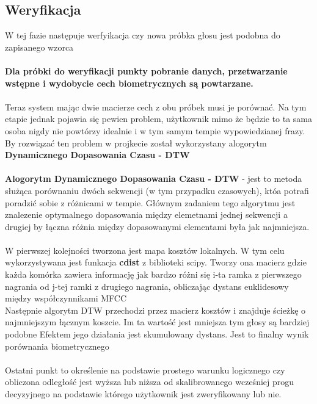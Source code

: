 \subsection{Weryfikacja}
W tej fazie następuje werfyikacja czy nowa próbka głosu jest podobna do zapisanego wzorca
\\
\\
\textbf{Dla próbki do weryfikacji punkty pobranie danych, przetwarzanie wstępne i wydobycie cech biometrycznych są powtarzane.}
\\
\\
Teraz system mając dwie macierze cech z obu próbek musi je porównać. Na tym etapie jednak pojawia się pewien problem, użytkownik mimo że będzie to ta sama osoba nigdy nie powtórzy idealnie i w tym samym tempie wypowiedzianej frazy. By rozwiązać ten problem w projkecie został wykorzystany alogorytm \textbf{Dynamicznego Dopasowania Czasu - DTW}
\\
\\
\textbf{Alogorytm Dynamicznego Dopasowania Czasu - DTW} - jest to metoda służąca porównaniu dwóch sekwencji (w tym przypadku czasowych), któa potrafi poradzić sobie z różnicami w tempie.
Głównym zadaniem tego algorytmu jest znalezenie optymalnego dopasowania między elemetnami jednej sekwencji a drugiej by łączna różnia między dopasowanymi elementami była jak najmniejsza.
\\
\\
W pierwszej kolejności tworzona jest mapa kosztów lokalnych. W tym celu wykorzystywana jest funkacja \textbf{cdist} z biblioteki scipy. Tworzy ona macierz gdzie każda komórka zawiera informację jak bardzo różni się i-ta ramka z pierwszego nagrania od j-tej ramki z drugiego nagrania, obliczając dystans euklidesowy między współczynnikami MFCC
\newline
\\
Następnie algorytm DTW przechodzi przez macierz kosztów i znajduje ścieżkę o najmniejszym łącznym koszcie. Im ta wartość jest mniejsza tym głosy są bardziej podobne
Efektem jego działania jest skumulowany dystans. Jest to finalny wynik porównania biometrycznego
\\
\\
Ostatni punkt to określenie na podstawie prostego warunku logicznego czy obliczona odległość jest wyższa lub niższa od skalibrowanego wcześniej progu decyzyjnego na podstawie którego użytkownik jest zweryfikowany lub nie.  

